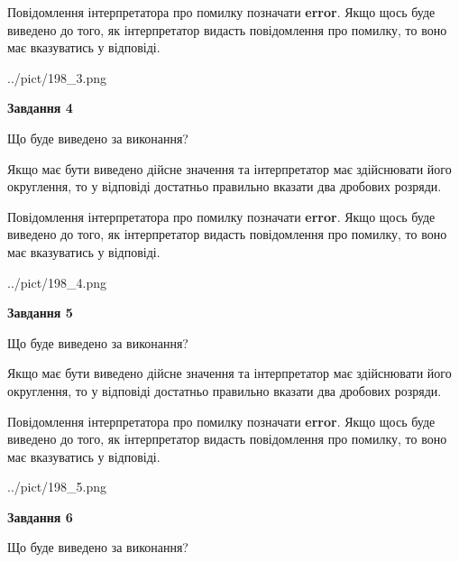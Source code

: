 \documentclass[12pt, ukrainian]{article}
\begin{document}
{\begin {Large}
Повідомлення інтерпретатора про помилку позначати \textbf{error}.
Якщо щось буде виведено до того, як інтерпретатор видасть повідомлення про помилку, 
то воно має вказуватись у відповіді. \par

\begin{center}
	{../pict/198_3.png}
\end{center}
\newpage

{\begin {center}\textbf{Завдання 4}\end {center}}\par
Що буде виведено за виконання? \par

Якщо має бути виведено дійсне значення та інтерпретатор має здійснювати його округлення, 
то у відповіді достатньо правильно вказати два дробових розряди.

Повідомлення інтерпретатора про помилку позначати \textbf{error}.
Якщо щось буде виведено до того, як інтерпретатор видасть повідомлення про помилку, 
то воно має вказуватись у відповіді. \par

\begin{center}
	{../pict/198_4.png}
\end{center}
\newpage

{\begin {center}\textbf{Завдання 5}\end {center}}\par
Що буде виведено за виконання? \par

Якщо має бути виведено дійсне значення та інтерпретатор має здійснювати його округлення, 
то у відповіді достатньо правильно вказати два дробових розряди.

Повідомлення інтерпретатора про помилку позначати \textbf{error}.
Якщо щось буде виведено до того, як інтерпретатор видасть повідомлення про помилку, 
то воно має вказуватись у відповіді. \par

\begin{center}
	{../pict/198_5.png}
\end{center}
\newpage

{\begin {center}\textbf{Завдання 6}\end {center}}\par
Що буде виведено за виконання? \par


\end{Large}}
\end{document}
